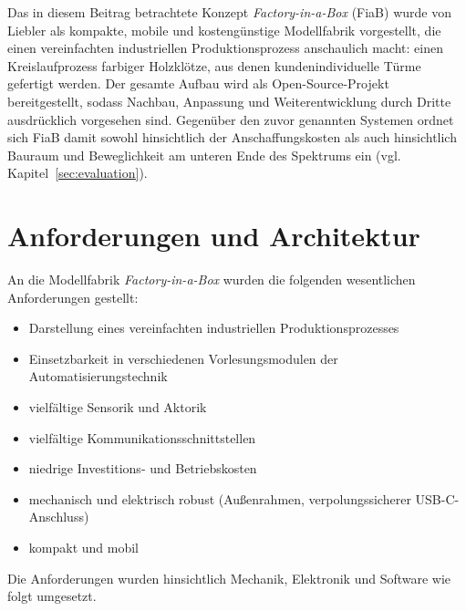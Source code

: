 \documentclass[]{article}%
\begin{document}
Das in diesem Beitrag betrachtete Konzept \emph{Factory-in-a-Box} (FiaB) wurde von Liebler \cite{liebler2025} als kompakte, mobile und kostengünstige Modellfabrik vorgestellt, die einen vereinfachten industriellen Produktionsprozess anschaulich macht: einen Kreislaufprozess farbiger Holzklötze, aus denen kundenindividuelle Türme gefertigt werden. Der gesamte Aufbau wird als Open-Source-Projekt bereitgestellt, sodass Nachbau, Anpassung und Weiterentwicklung durch Dritte ausdrücklich vorgesehen sind. Gegenüber den zuvor genannten Systemen ordnet sich FiaB damit sowohl hinsichtlich der Anschaffungskosten als auch hinsichtlich Bauraum und Beweglichkeit am unteren Ende des Spektrums ein (vgl. Kapitel~\ref{sec:evaluation}).

\section{Anforderungen und Architektur}

An die Modellfabrik \emph{Factory-in-a-Box} wurden die folgenden wesentlichen Anforderungen gestellt:

\begin{itemize}
\item Darstellung eines vereinfachten industriellen Produktionsprozesses
\item Einsetzbarkeit in verschiedenen Vorlesungsmodulen der Automatisierungstechnik
\item vielfältige Sensorik und Aktorik
\item vielfältige Kommunikationsschnittstellen
\item niedrige Investitions- und Betriebskosten
\item mechanisch und elektrisch robust (Außenrahmen, verpolungssicherer USB-C-Anschluss)
\item kompakt und mobil
\end{itemize}

Die Anforderungen wurden hinsichtlich Mechanik, Elektronik und Software wie folgt umgesetzt.
\end{document}
